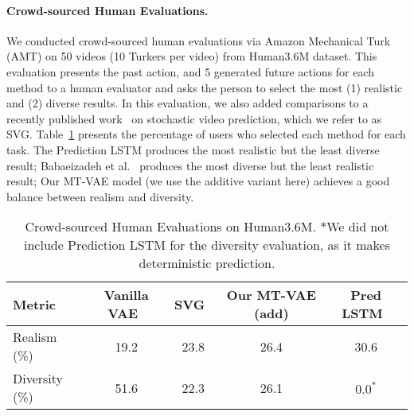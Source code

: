 \documentclass[runningheads]{llncs}
\begin{document}
\paragraph{Crowd-sourced Human Evaluations.}

We conducted crowd-sourced human evaluations via Amazon Mechanical Turk (AMT) on 50 videos (10 Turkers per video) from Human3.6M dataset.
This evaluation presents the past action, and 5 generated future actions for each method to a human evaluator and asks the person to select the most (1) realistic and (2) diverse results.
In this evaluation, we also added comparisons to a recently published work~\cite{denton2018stochastic} on stochastic video prediction, which we refer to as SVG.
Table~\ref{tab:table_h36m_AMT} presents the percentage of users who selected each method for each task. 
The Prediction LSTM produces the most realistic but the least diverse result;
Babaeizadeh et al.~\cite{mohammad2018stochastic} produces the most diverse but the least realistic result; Our MT-VAE model (we use the additive variant here) achieves a good balance between 
realism and diversity.

\begin{table}[t]
\small
\caption{
Crowd-sourced Human Evaluations on Human3.6M. *We did not include Prediction LSTM for the diversity evaluation, as it makes deterministic prediction.
}
\centering
\begin{tabular}{l||c|c|c||c}
\hline
Metric  & Vanilla VAE~\cite{mohammad2018stochastic} & SVG~\cite{denton2018stochastic} & Our MT-VAE (add) & Pred LSTM~\cite{villegas2017learning}\\
\hline
Realism (\%)  & 19.2 & 23.8 & 26.4 & 30.6\\
\hline
Diversity (\%)  & 51.6 & 22.3 & 26.1 & ${0.0}^*$\\
\hline
\end{tabular}
\label{tab:table_h36m_AMT}
\vspace*{-0.1in}
\end{table}
\end{document}
